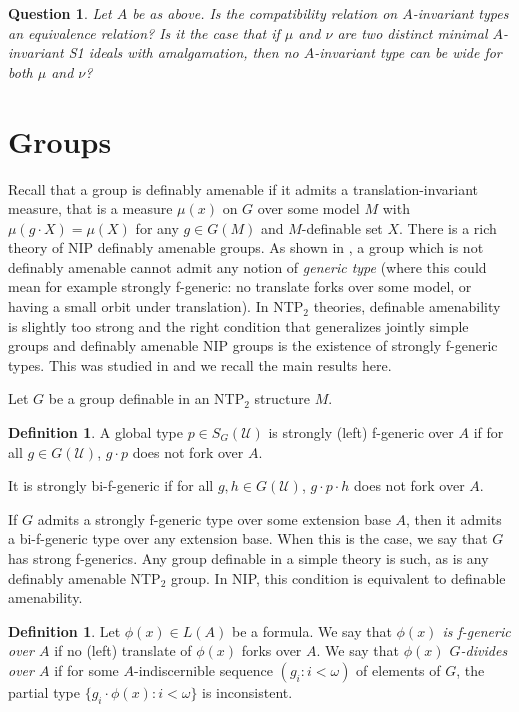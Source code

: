 \documentclass{amsart}
\numberwithin{equation}{section}
\newtheorem{question}[thm]{Question}
\theoremstyle{definition}
\newtheorem{defi}[thm]{Definition}
\theoremstyle{mystyle}
\theoremstyle{remark}
\newcommand{\monster}{\mathcal U}
\begin{document}
\begin{question}
Let $A$ be as above. Is the compatibility relation on $A$-invariant types an equivalence relation? Is it the case that if $\mu$ and $\nu$ are two distinct minimal $A$-invariant S1 ideals with amalgamation, then no $A$-invariant type can be wide for both $\mu$ and $\nu$?
\end{question}

\section{Groups}

Recall that a group is definably amenable if it admits a translation-invariant measure, that is a measure $\mu(x)$ on $G$ over some model $M$ with $\mu(g\cdot X)=\mu(X)$ for any $g\in G(M)$ and $M$-definable set $X$. There is a rich theory of NIP definably amenable groups. As shown in \cite{tamedyn}, a group which is not definably amenable cannot admit any notion of \emph{generic type} (where this could mean for example strongly f-generic: no translate forks over some model, or having a small orbit under translation). In NTP$_2$ theories, definable amenability is slightly too strong and the right condition that generalizes jointly simple groups and definably amenable NIP groups is the existence of strongly f-generic types. This was studied in \cite{PRC} and we recall the main results here.

Let $G$ be a group definable in an NTP$_2$ structure $M$.

\begin{defi}\label{strong f generics}
A global type $p\in S_G(\monster)$ is strongly (left) f-generic
over $A$ if for all $g\in G(\monster)$, $g\cdot p$ does not fork
over $A$.

It is strongly bi-f-generic if for all $g,h\in G(\monster)$, $g\cdot p \cdot h$ does not fork over $A$.
\end{defi}

If $G$ admits a strongly f-generic type over some extension base $A$, then it admits a bi-f-generic type over any extension base. When this is the case, we say that $G$ has strong f-generics. Any group definable in a simple theory is such, as is any definably amenable NTP$_2$ group. In NIP, this condition is equivalent to definable amenability.


\begin{defi}
Let $\phi(x)\in L(A)$ be a formula. We say that \emph{$\phi(x)$ is f-generic over $A$} if no (left) translate of $\phi(x)$ forks over $A$. We say that \emph{$\phi(x)$ $G$-divides over $A$} if for some $A$-indiscernible sequence $(g_i:i<\omega)$ of elements of $G$, the partial type $\{g_i\cdot \phi(x):i<\omega\}$ is inconsistent.
\end{defi}
\end{document}
